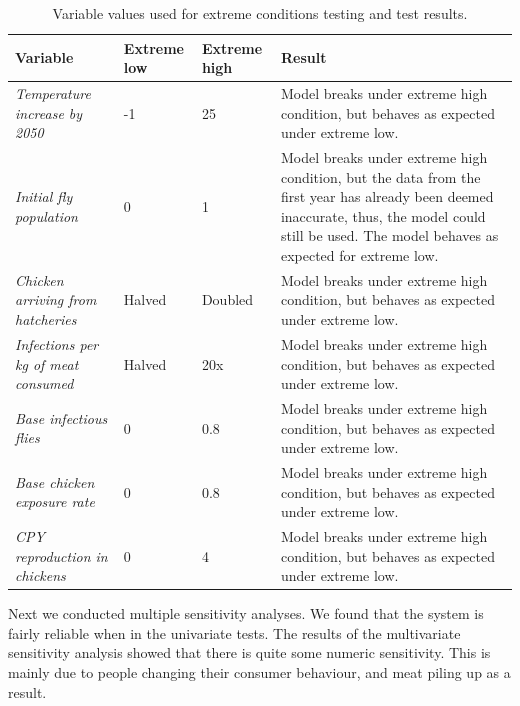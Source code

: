 \begin{longtable}[c]{m{8em} m{2em} m{2em} m{22em}}
\caption{Variable values used for extreme conditions testing and test results.}
\label{tab:extreme_values_results}\\
\hline
Variable & Extreme low & Extreme high & Result \\
\hline
\endfirsthead
%
\endhead

\textit{Temperature increase by 2050}   &   -1          &   25              &   Model breaks under extreme high condition, but behaves as expected under extreme low. \hline \\
\textit{Initial fly population}         &   0           &   1               &   Model breaks under extreme high condition, but the data from the first year has already been deemed inaccurate, thus, the model could still be used. The model behaves as expected for extreme low.   \hline \\
\textit{Chicken arriving from hatcheries} & Halved      &   Doubled         &   Model breaks under extreme high condition, but behaves as expected under extreme low. \hline \\
\textit{Infections per kg of meat consumed} &   Halved  &   20x             &   Model breaks under extreme high condition, but behaves as expected under extreme low. \hline \\
\textit{Base infectious flies}          &   0           &   0.8             &   Model breaks under extreme high condition, but behaves as expected under extreme low. \hline \\
\textit{Base chicken exposure rate}     &   0           &   0.8             &   Model breaks under extreme high condition, but behaves as expected under extreme low. \hline \\
\textit{CPY reproduction in chickens}   &   0           &   4               &   Model breaks under extreme high condition, but behaves as expected under extreme low. \\ \hline
\end{longtable}

Next we conducted multiple sensitivity analyses. We found that the system is fairly reliable when in the univariate tests. The results of the multivariate sensitivity analysis showed that there is quite some numeric sensitivity. This is mainly due to people changing their consumer behaviour, and meat piling up as a result.

